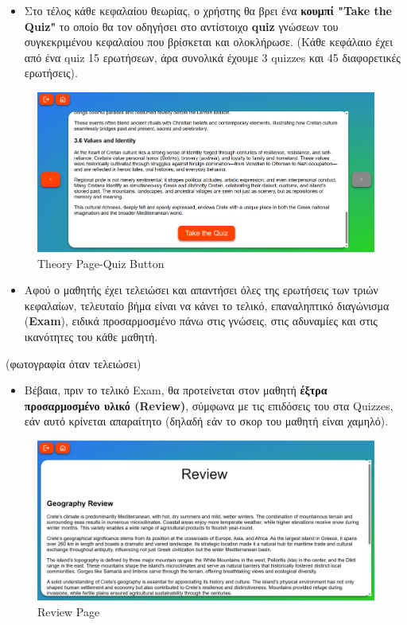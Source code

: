 \begin{itemize}
    \item Στο τέλος κάθε κεφαλαίου θεωρίας, ο χρήστης θα βρει ένα \textbf{κουμπί \textlatin{"Take the Quiz"}} το οποίο θα τον οδηγήσει στο αντίστοιχο \textlatin{\textbf{quiz}} γνώσεων του συγκεκριμένου κεφαλαίου που βρίσκεται και ολοκλήρωσε. (Κάθε κεφάλαιο έχει από ένα \textlatin{quiz} 15 ερωτήσεων, άρα συνολικά έχουμε 3 \textlatin{quizzes} και 45 διαφορετικές ερωτήσεις).
\end{itemize}
\begin{figure}[H]
    \centering
    \includegraphics[width=1\linewidth]{img/Theory-TestButton.png}
    \caption{\textlatin{Theory Page-Quiz Button}}
\end{figure}

\begin{itemize}
    \item Αφού ο μαθητής έχει τελειώσει και απαντήσει όλες της ερωτήσεις των τριών κεφαλαίων, τελευταίο βήμα είναι να κάνει το τελικό, επαναληπτικό διαγώνισμα (\textlatin{\textbf{Exam}}), ειδικά προσαρμοσμένο πάνω στις γνώσεις, στις αδυναμίες και στις ικανότητες του κάθε μαθητή.
\end{itemize}
(φωτογραφία όταν τελειώσει)

\begin{itemize}
    \item Βέβαια, πριν το τελικό \textlatin{Exam}, θα προτείνεται στον μαθητή \textbf{έξτρα προσαρμοσμένο υλικό (\textlatin{Review})}, σύμφωνα με τις επιδόσεις του στα \textlatin{Quizzes}, εάν αυτό κρίνεται απαραίτητο (δηλαδή εάν το σκορ του μαθητή είναι χαμηλό).
\end{itemize}
\begin{figure}[H]
    \centering
    \includegraphics[width=1\linewidth]{img/Review.png}
    \caption{\textlatin{Review Page}}
\end{figure}



